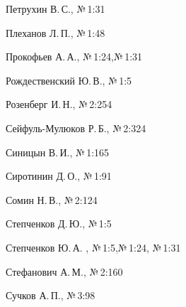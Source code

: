 \begin{theindex}
\pagebreak







\item Петрухин В.\,С., №\,1:31


\item Плеханов Л.\,П., №\,1:48


\item Прокофьев А.\,А., №\,1:24,\newline  №\,1:31


\vspace*{-2pt}





  \indexspace





\item Рождественский Ю.\,В., №\,1:5\hspace*{-1.32pt}


\item Розенберг И.\,Н., №\,2:254


\vspace*{-2pt}





 


 \indexspace





\item Сейфуль-Мулюков Р.\,Б.,  №\,2:324\hspace*{-18.2pt}


\item Синицын В.\,И., №\,1:165


\item Сиротинин Д.\,О., №\,1:91


\item Сомин Н.\,В., №\,2:124


\item Степченков Д.\,Ю., №\,1:5


\item Степченков Ю.\,А. , №\,1:5,\newline  №\,1:24, №\,1:31


\item Стефанович А.\,М.,  №\,2:160


\item Сучков А.\,П., №\,3:98



\end{theindex}
